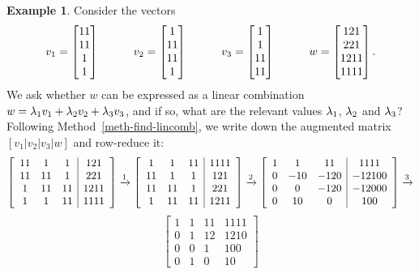 \documentclass[reqno]{amsart}
\theoremstyle{definition}
\newtheorem{example}[theorem]{Example}
\begin{document}
\begin{example}\label{eg-find-lincomb-i}
 Consider the vectors
 \[ v_1 = \left[\begin{matrix} 11 \\ 11 \\ 1 \\ 1 \end{matrix}\right] \hspace{3em}
    v_2 = \left[\begin{matrix} 1 \\ 11 \\ 11 \\ 1 \end{matrix}\right] \hspace{3em}
    v_3 = \left[\begin{matrix} 1 \\ 1 \\ 11 \\ 11 \end{matrix}\right] \hspace{3em}
    w   = \left[\begin{matrix} 121 \\ 221 \\ 1211 \\ 1111 \end{matrix}\right].
 \]
 We ask whether $w$ can be expressed as a linear combination
 $w=\lambda_1v_1+\lambda_2v_2+\lambda_3v_3$, and if so, what are the relevant
 values $\lambda_1$, $\lambda_2$ and $\lambda_3$?  Following
 Method~\ref{meth-find-lincomb}, we write down the augmented
 matrix $[v_1|v_2|v_3|w]$ and row-reduce it:
 \[
  \left[\begin{array}{ccc|c}
   11 &  1 &  1 & 121 \\
   11 & 11 &  1 & 221 \\
    1 & 11 & 11 & 1211 \\
    1 &  1 & 11 & 1111
  \end{array}\right]
  \xrightarrow{1}
  \left[\begin{array}{ccc|c}
    1 &  1 & 11 & 1111 \\
   11 &  1 &  1 & 121 \\
   11 & 11 &  1 & 221 \\
    1 & 11 & 11 & 1211
  \end{array}\right]
  \xrightarrow{2}
  \left[\begin{array}{ccc|c}
    1 &   1 &   11 & 1111 \\
    0 & -10 & -120 & -12100 \\
    0 &   0 & -120 & -12000 \\
    0 &  10 &    0 & 100
  \end{array}\right]
  \xrightarrow{3}
 \] \[
  \left[\begin{array}{ccc|c}
    1 &   1 &   11 & 1111 \\
    0 &   1 &   12 & 1210 \\
    0 &   0 &    1 & 100 \\
    0 &   1 &    0 & 10
  \end{array}\right]
\]
\end{example}
\end{document}
